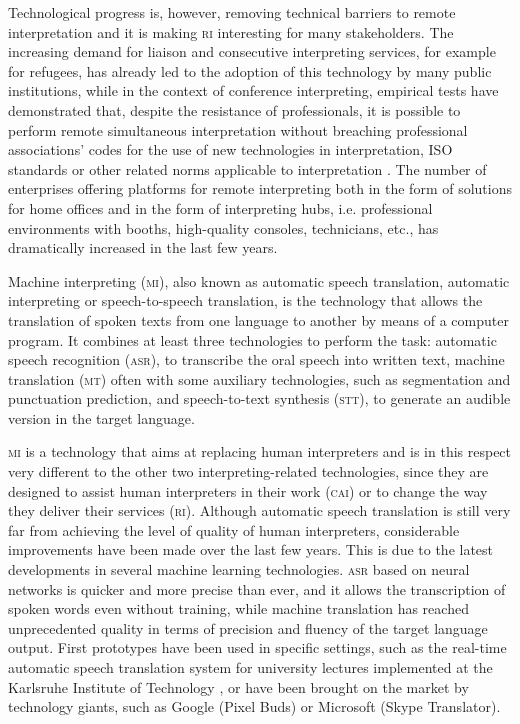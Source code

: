 \documentclass[output=paper]{langsci/langscibook}
\begin{document}
Technological progress is, however, removing technical barriers to remote interpretation and it is making \textsc{ri} interesting for many stakeholders. The increasing demand for liaison and consecutive interpreting services, for example for refugees, has already led to the adoption of this technology by many public institutions, while in the context of conference interpreting, empirical tests have demonstrated that, despite the resistance of professionals, it is possible to perform remote simultaneous interpretation without breaching professional associations’ codes for the use of new technologies in interpretation, ISO standards or other related norms applicable to interpretation \citep[202]{Causo2011b}. The number of enterprises offering platforms for remote interpreting both in the form of solutions for home offices and in the form of interpreting hubs, i.e. professional environments with booths, high-quality consoles, technicians, etc., has dramatically increased in the last few years.  
 
Machine interpreting (\textsc{mi}), also known as automatic speech translation, automatic interpreting or speech-to-speech translation, is the technology that allows the translation of spoken texts from one language to another by means of a computer program. It combines at least three technologies to perform the task: automatic speech recognition (\textsc{asr}), to transcribe the oral speech into written text, machine translation (\textsc{mt}) often with some auxiliary technologies, such as segmentation and punctuation prediction, and speech-to-text synthesis (\textsc{stt}), to generate an audible version in the target language. 
 
\textsc{mi} is a technology that aims at replacing human interpreters and is in this respect very different to the other two interpreting-related technologies, since they are designed to assist human interpreters in their work (\textsc{cai}) or to change the way they deliver their services (\textsc{ri}). Although automatic speech translation is still very far from achieving the level of quality of human interpreters, considerable improvements have been made over the last few years. This is due to the latest developments in several machine learning technologies. \textsc{asr} based on neural networks is quicker and more precise than ever, and it allows the transcription of spoken words even without training, while machine translation has reached unprecedented quality in terms of precision and fluency of the target language output. First prototypes have been used in specific settings, such as the real-time automatic speech translation system for university lectures implemented at the Karlsruhe Institute of Technology \citep{muller_lecture_2016}, or have been brought on the market by technology giants, such as Google (Pixel Buds) or Microsoft (Skype Translator).  
 
\end{document}
